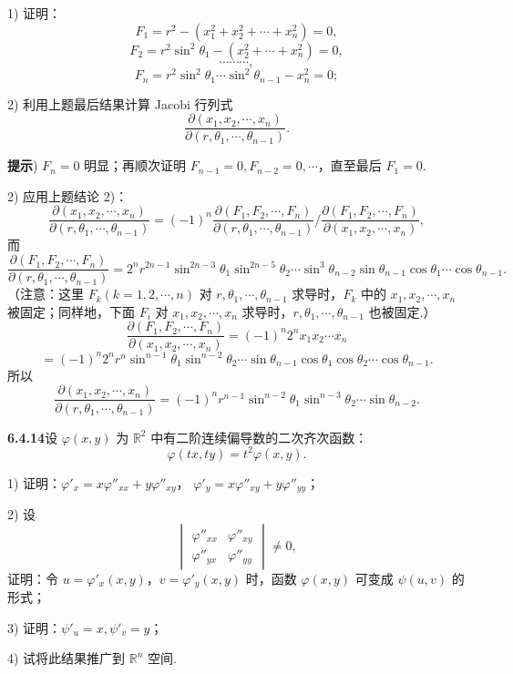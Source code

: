 \documentclass[UTF8, 12pt, fontset=fandol, oneside]{ctexart}
\begin{document}
1) 证明：
\[
  F_1=r^2-(x_1^2+x_2^2+\cdots+x_n^2)=0,
\]
\[
  F_2=r^2\sin^2\theta_1-(x_2^2+\cdots+x_n^2)=0,
\]
\[
  \cdots\cdots\cdots,
\]
\[
  F_n=r^2\sin^2\theta_1\cdots\sin^2\theta_{n-1}-x_n^2=0;
\]

2) 利用上题最后结果计算 Jacobi 行列式
\[
  \frac{\partial(x_1,x_2,\cdots,x_n)}
       {\partial(r,\theta_1,\cdots,\theta_{n-1})}.
\]

\noindent\textbf{提示}) $F_n=0$ 明显；再顺次证明 $F_{n-1}=0,F_{n-2}=0,\cdots$，直至最后 $F_1=0$.

2) 应用上题结论 2)：
\[
  \frac{\partial(x_1,x_2,\cdots,x_n)}
       {\partial(r,\theta_1,\cdots,\theta_{n-1})}
  =
  (-1)^n
  \frac{\partial(F_1,F_2,\cdots,F_n)}
       {\partial(r,\theta_1,\cdots,\theta_{n-1})}
  \bigg/
  \frac{\partial(F_1,F_2,\cdots,F_n)}
       {\partial(x_1,x_2,\cdots,x_n)},
\]
而
\[
  \frac{\partial(F_1,F_2,\cdots,F_n)}
       {\partial(r,\theta_1,\cdots,\theta_{n-1})}
  =
  2^n r^{2n-1}\sin^{2n-3}\theta_1\sin^{2n-5}\theta_2
  \cdots\sin^3\theta_{n-2}\sin\theta_{n-1}
  \cos\theta_1\cdots\cos\theta_{n-1}.
\]
（注意：这里 $F_k(k=1,2,\cdots,n)$ 对 $r,\theta_1,\cdots,\theta_{n-1}$ 求导时，$F_k$ 中的 $x_1,x_2,\cdots,x_n$ 被固定；同样地，下面 $F_i$ 对 $x_1,x_2,\cdots,x_n$ 求导时，$r,\theta_1,\cdots,\theta_{n-1}$ 也被固定.）
\[
  \frac{\partial(F_1,F_2,\cdots,F_n)}
       {\partial(x_1,x_2,\cdots,x_n)}
  =
  (-1)^n2^n x_1x_2\cdots x_n
\]
\[
  =
  (-1)^n2^n r^n\sin^{n-1}\theta_1\sin^{n-2}\theta_2
  \cdots\sin\theta_{n-1}\cos\theta_1\cos\theta_2\cdots\cos\theta_{n-1}.
\]
所以
\[
  \frac{\partial(x_1,x_2,\cdots,x_n)}
       {\partial(r,\theta_1,\cdots,\theta_{n-1})}
  =
  (-1)^n r^{n-1}\sin^{n-2}\theta_1\sin^{n-3}\theta_2\cdots\sin\theta_{n-2}.
\]

\noindent\textbf{6.4.14}\quad 设 $\varphi(x,y)$ 为 $\mathbb R^2$ 中有二阶连续偏导数的二次齐次函数：
\[
  \varphi(tx,ty)=t^2\varphi(x,y).
\]

1) 证明：$\varphi'_x=x\varphi''_{xx}+y\varphi''_{xy}$，
$\varphi'_y=x\varphi''_{xy}+y\varphi''_{yy}$；

2) 设
\[
  \begin{vmatrix}
    \varphi''_{xx} & \varphi''_{xy}\\
    \varphi''_{yx} & \varphi''_{yy}
  \end{vmatrix}
  \ne0,
\]
证明：令 $u=\varphi'_x(x,y)$，$v=\varphi'_y(x,y)$ 时，函数 $\varphi(x,y)$ 可变成 $\psi(u,v)$ 的形式；

3) 证明：$\psi'_u=x,\psi'_v=y$；

4) 试将此结果推广到 $\mathbb R^n$ 空间.
\end{document}
